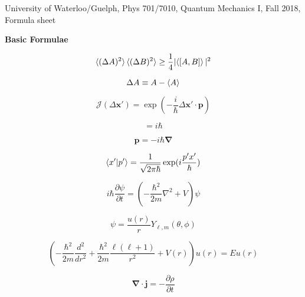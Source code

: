 \documentclass[11pt]{article}
\newcommand{\CurJ}{\mathcal{J}}
\newcommand{\vect}[1]{\boldsymbol{\mathbf{#1}}}
\begin{document}
\begin{center}
{\large University of Waterloo/Guelph, Phys 701/7010, Quantum Mechanics I, Fall 2018, Formula sheet}
\end{center}

\begin{multicols}{2}

{\bf Basic Formulae}

\begin{equation} %
\braket{(\Delta A)^2} \braket{(\Delta B)^2}
  \ge \frac{1}{4} |\!\braket{[A,B]}|^2
\end{equation}

\begin{equation}
\Delta A \equiv A - \braket{A}
\end{equation}

\begin{equation}
\CurJ (\Delta \vect{x}') = \exp \left (-\frac{i}{\hbar} \Delta \vect{x}' \cdot \vect{p} \right)
\end{equation}

\begin{equation}
[\,x,p\,] = i\hbar
\end{equation}

\begin{equation}
\vect{p} = -i \hbar \vect{\nabla}
\end{equation}

\begin{equation}
\braket{x'|p'} = \frac{1}{\sqrt{2\pi\hbar}} \exp (i\frac{p'x'}{\hbar})
\end{equation}

\begin{equation}
i\hbar \frac{\partial \psi}{\partial t} = (-\frac{\hbar^2}{2m} \nabla^2 + V) \psi
\end{equation}

\begin{equation}
\psi = \frac{u(r)}{r} Y_{\ell,m}(\theta,\phi)
\end{equation}

\begin{equation}
\left(
  -\frac{\hbar^2}{2m} \frac{d^2}{d r^2}
  + \frac{\hbar^2}{2m} \frac{\ell (\ell+1)}{r^2}
  + V(r)
\right) u(r) = E u(r)
\end{equation}

\begin{equation}
\vect{\nabla} \cdot \vect{j} = - \frac{\partial \rho}{\partial t}
\end{equation}


\end{multicols}
\end{document}
